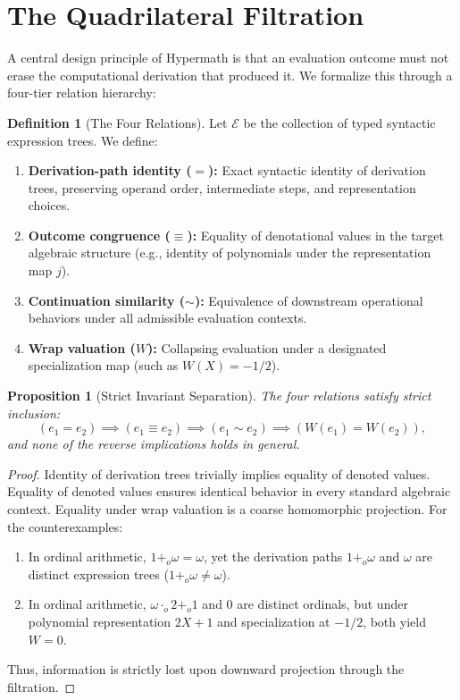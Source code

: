 \documentclass[11pt]{article}
\newtheorem{proposition}[theorem]{Proposition}
\theoremstyle{definition}
\newtheorem{definition}[theorem]{Definition}
\begin{document}
\section{The Quadrilateral Filtration}
A central design principle of Hypermath is that an evaluation outcome must not erase the computational derivation that produced it. We formalize this through a four-tier relation hierarchy:

\begin{definition}[The Four Relations]
Let $\mathcal{E}$ be the collection of typed syntactic expression trees. We define:
\begin{enumerate}
\item \textbf{Derivation-path identity ($=$):} Exact syntactic identity of derivation trees, preserving operand order, intermediate steps, and representation choices.
\item \textbf{Outcome congruence ($\equiv$):} Equality of denotational values in the target algebraic structure (e.g., identity of polynomials under the representation map $j$).
\item \textbf{Continuation similarity ($\sim$):} Equivalence of downstream operational behaviors under all admissible evaluation contexts.
\item \textbf{Wrap valuation ($W$):} Collapsing evaluation under a designated specialization map (such as $W(X) = -1/2$).
\end{enumerate}
\end{definition}

\begin{proposition}[Strict Invariant Separation]
The four relations satisfy strict inclusion:
\[
(e_1 = e_2) \implies (e_1 \equiv e_2) \implies (e_1 \sim e_2) \implies (W(e_1) = W(e_2)),
\]
and none of the reverse implications holds in general.
\end{proposition}
\begin{proof}
Identity of derivation trees trivially implies equality of denoted values. Equality of denoted values ensures identical behavior in every standard algebraic context. Equality under wrap valuation is a coarse homomorphic projection. For the counterexamples:
\begin{enumerate}
\item In ordinal arithmetic, $1 +_o \omega = \omega$, yet the derivation paths $1 +_o \omega$ and $\omega$ are distinct expression trees ($1 +_o \omega \ne \omega$).
\item In ordinal arithmetic, $\omega \cdot_o 2 +_o 1$ and $0$ are distinct ordinals, but under polynomial representation $2X + 1$ and specialization at $-1/2$, both yield $W = 0$.
\end{enumerate}
Thus, information is strictly lost upon downward projection through the filtration.
\end{proof}
\end{document}
